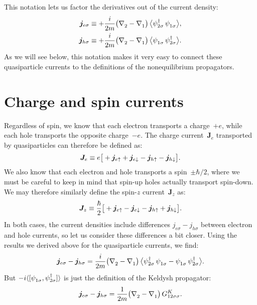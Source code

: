 This notation lets us factor the derivatives out of the current density:
\begin{align}
  \bm{j}_{e\sigma} &\equiv
  +\frac{i}{2m} \big(\pc{\nabla_2} - \pc{\nabla_1}\big) \,
  \avg[\big]{\hc{\psi_{2 \sigma}}\, \pc{\psi_{1 \sigma}}} ,\\
  \bm{j}_{h\sigma} &\equiv
  +\frac{i}{2m} \big(\pc{\nabla_2} - \pc{\nabla_1}\big) \,
  \avg[\big]{\pc{\psi_{1 \sigma}}\, \hc{\psi_{2 \sigma}}} .
\end{align}
As we will see below, this notation makes it very easy to connect these quasiparticle currents to the definitions of the nonequilibrium propagators.

\section{Charge and spin currents}
Regardless of spin, we know that each electron transports a charge~$+e$, while each hole transports the opposite charge~$-e$.
The charge current~$\bm{J}_e$ transported by quasiparticles can therefore be defined as:
\begin{equation}
  \bm{J}_e \equiv e\big[ +\bm{j}_{e\uparrow} + \bm{j}_{e\downarrow} - \bm{j}_{h\uparrow} - \bm{j}_{h\downarrow} \big].
\end{equation}
We also know that each electron and hole transports a spin~$\pm\hbar/2$, where we must be careful to keep in mind that spin-up holes actually transport spin-down.
We may therefore similarly define the spin-$z$ current~$\bm{J}_z$ as:
\begin{equation}
  \bm{J}_z \equiv \frac{\hbar}{2}\big[ +\bm{j}_{e\uparrow} - \bm{j}_{e\downarrow} - \bm{j}_{h\uparrow} + \bm{j}_{h\downarrow} \big].
\end{equation}
In both cases, the current densities include differences $j_{e\sigma} - j_{h\sigma}$ between electron and hole currents, so let us consider these differences a bit closer.
Using the results we derived above for the quasiparticle currents, we find:
\begin{align}
  \bm{j}_{e\sigma} - \bm{j}_{h\sigma} =
  \frac{i}{2m} \big(\pc{\nabla_2} - \pc{\nabla_1}\big) \,
  \avg[\big]{\hc{\psi_{2 \sigma}}\, \pc{\psi_{1 \sigma}} -
             \pc{\psi_{1 \sigma}}\, \hc{\psi_{2 \sigma}}} .
\end{align}
But $-i\avg{ [ \pc{\psi_{1 \sigma}}, \hc{\psi_{2 \sigma}} ] }$ is just the definition of the Keldysh propagator:
\begin{align}
  \bm{j}_{e\sigma} - \bm{j}_{h\sigma} =
  \frac{1}{2m} \big(\pc{\nabla_2} - \pc{\nabla_1}\big) \, G^K_{12\sigma\sigma}.
\end{align}
